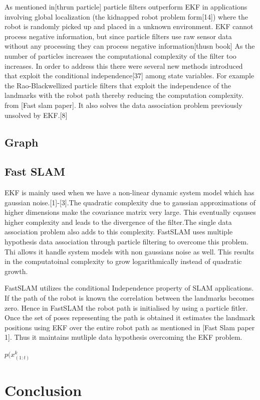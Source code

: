 \documentclass[conference]{IEEEtran}
\begin{document}
As mentioned in[thrun particle] particle filters outperform EKF in applications involving global localization (the kidnapped robot problem form[14]) where the robot is randomly picked up and placed in a unknown environment. 
EKF cannot process negative information, but since particle filters use raw sensor data without any processing they can process negative information[thusn book]
As the number of particles increases the computational complexity of the filter too increases. In order to address this there were several new methods introduced that  exploit the conditional independence[37] among state variables. For example the Rao-Blackwellized particle filters that exploit the independence of the landmarks with the robot path thereby reducing the computation complexity. from [Fast slam paper]. It also solves the data association problem previously unsolved by EKF.[8]
	
	
	
	\subsection{Graph}
	
	\subsection{Fast SLAM}
	EKF is mainly used when we have a non-linear dynamic system model which has gaussian noise.[1]-[3].The quadratic complexity due to gaussian approximations of higher dimensions make the covariance matrix very large. This eventually cqauses higher complexity and leads to the divergence of the filter.The single data association problem also adds to this complexity. FastSLAM uses multiple hypothesis data association through particle filtering to overcome this problem. Thi allows it handle system models with non gaussians noise as well. This results in the computatoinal complexity to grow logarithmically instead of quadratic growth.
	
	FastSLAM utilizes the conditional Independence property of SLAM applications. If the path of the robot is known the correlation between the landmarks becomes zero. Hence in FastSLAM the robot path is initialised by using a particle fitler. Once the set of poses representing the path is obtained it estimates the landmark positions using EKF over the entire robot path as mentioned in [Fast Slam paper 1]. Thus it maintains mutliple data hypothesis overcoming the EKF problem.
	
	$p(x^{k}_(1:t)$ 
	
	
	
	
	
	
	
	
	
	
	
	
	
	
	
	
	\section{Conclusion}
	
	
	
	
	
	
	
	
	
	
	
\end{document}
